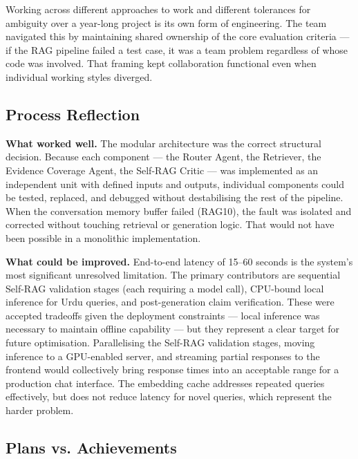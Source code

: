Working across different approaches to work and different tolerances for 
ambiguity over a year-long project is its own form of engineering. The team 
navigated this by maintaining shared ownership of the core evaluation criteria 
— if the RAG pipeline failed a test case, it was a team problem regardless of 
whose code was involved. That framing kept collaboration functional even when 
individual working styles diverged.

\subsection{Process Reflection}

\textbf{What worked well.} The modular architecture was the correct structural 
decision. Because each component — the Router Agent, the Retriever, the 
Evidence Coverage Agent, the Self-RAG Critic — was implemented as an 
independent unit with defined inputs and outputs, individual components could 
be tested, replaced, and debugged without destabilising the rest of the 
pipeline. When the conversation memory buffer failed (RAG10), the fault was 
isolated and corrected without touching retrieval or generation logic. That 
would not have been possible in a monolithic implementation.

\textbf{What could be improved.} End-to-end latency of 15--60 seconds is the 
system's most significant unresolved limitation. The primary contributors are 
sequential Self-RAG validation stages (each requiring a model call), CPU-bound 
local inference for Urdu queries, and post-generation claim verification. These 
were accepted tradeoffs given the deployment constraints — local inference was 
necessary to maintain offline capability — but they represent a clear target 
for future optimisation. Parallelising the Self-RAG validation stages, moving 
inference to a GPU-enabled server, and streaming partial responses to the 
frontend would collectively bring response times into an acceptable range for 
a production chat interface. The embedding cache addresses repeated queries 
effectively, but does not reduce latency for novel queries, which represent 
the harder problem.

\subsection{Plans vs. Achievements}

